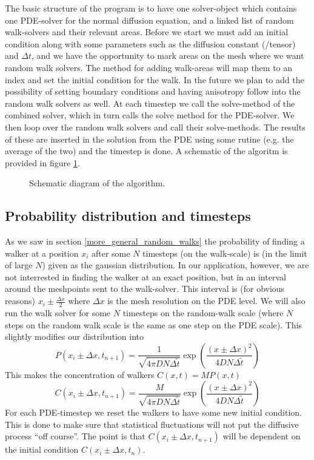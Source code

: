 The basic structure of the program is to have one solver-object which contains one PDE-solver for the normal diffusion equation, and a linked list of random walk-solvers and their relevant areas. 
Before we start we must add an initial condition along with some parameters such as the diffusion constant (/tensor) and $\Delta t$, and we have the opportunity to mark areas on the mesh where we want random walk solvers. 
The method for adding walk-areas will map them to an index and set the initial condition for the walk. 
In the future we plan to add the possibility of setting boundary conditions and having anisotropy follow into the random walk solvers as well.
At each timestep we call the solve-method of the combined solver, which in turn calls the solve method for the PDE-solver. 
We then loop over the random walk solvers and call their solve-methods. 
The results of these are inserted in the solution from the PDE using some rutine (e.g. the average of the two) and the timestep is done. 
A schematic of the algoritm is provided in figure \ref{schematic}.

\begin{figure}[H]
\centering
\caption[Algorithm]{Schematic diagram of the algorithm.}
\label{schematic}
\end{figure}


\subsection{Probability distribution and timesteps}\label{probability_distribution_and_timesteps}
As we saw in section \ref{more_general_random_walks} the probability of finding a walker at a position $x_i$ after some $N$ timesteps (on the walk-scale) is (in the limit of large $N$) given as the gaussian distribution. 
In our application, however, we are not interrested in finding the walker at an exact position, but in an interval around the meshpoints sent to the walk-solver. 
This interval is (for obvious reasons) $x_i\pm\frac{\Delta x}{2}$ where $\Delta x$ is the mesh resolution on the PDE level. 
We will also run the walk solver for some $N$ timesteps on the random-walk scale (where $N$ steps on the random walk scale is the same as one step on the PDE scale). 
This slightly modifies our distribution into
\begin{equation}
 P(x_i\pm\Delta x,t_{n+1}) = \frac{1}{\sqrt{4\pi DN\Delta \tilde{t}}}\exp\left(\frac{(x\pm\Delta x)^2}{4DN\Delta \tilde{t}}\right)
\end{equation}
This makes the concentration of walkers $C(x,t) = MP(x,t)$
\begin{equation}
 C(x_i\pm\Delta x,t_{n+1}) = \frac{M}{\sqrt{4\pi DN\Delta \tilde{t}}}\exp\left(\frac{(x\pm\Delta x)^2}{4DN\Delta \tilde{t}}\right)
\end{equation}
For each PDE-timestep we reset the walkers to have some new initial condition. 
This is done to make sure that statistical fluctuations will not put the diffusive process ``off course''. 
The point is that $ C(x_i\pm\Delta x,t_{n+1})$ will be dependent on the initial condition $ C(x_i\pm\Delta x,t_{n})$.


